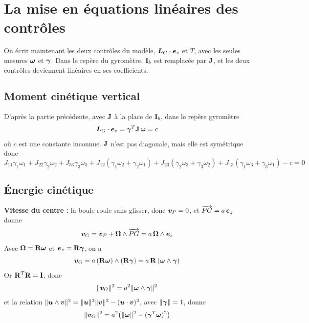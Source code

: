 
\section{La mise en équations linéaires des contrôles}

On écrit maintenant les deux contrôles du modèle,
$\bm{L}_G\cdot\bm{e}_z$ et $T$, avec les seules mesures
$\bm{\omega}$ et $\bm{\gamma}$. Dans le repère du gyromètre,
$\mathbf{I}_b$ est remplacée par $\mathbf{J}$, et les deux contrôles
deviennent linéaires en ses coefficients.

\subsection{Moment cinétique vertical}

D'après la partie précédente, avec $\mathbf{J}$ à la place de
$\mathbf{I}_b$, dans le repère gyromètre
\[
    \bm{L}_G\cdot\bm{e}_z = \bm{\gamma}^T\mathbf{J}\,\bm{\omega} = c
\]
où $c$ est une constante inconnue. $\mathbf{J}$ n'est pas diagonale,
mais elle est symétrique donc 
\[
    J_{11}\gamma_1\omega_1 + J_{22}\gamma_2\omega_2 + J_{33}\gamma_3\omega_3
    + J_{12}(\gamma_1\omega_2 + \gamma_2\omega_1)
    + J_{23}(\gamma_2\omega_3 + \gamma_3\omega_2)
    + J_{13}(\gamma_1\omega_3 + \gamma_3\omega_1) - c = 0
\]

\subsection{Énergie cinétique}

\textbf{Vitesse du centre : } la boule roule sans glisser, donc
$\bm{v}_P = 0$, et $\overrightarrow{PG} = a\,\bm{e}_z$ donne
\[
    \bm{v}_G = \bm{v}_P + \bm{\Omega}\wedge\overrightarrow{PG}
    = a\,\bm{\Omega}\wedge\bm{e}_z
\]
Avec $\bm{\Omega} = \mathbf{R}\bm{\omega}$ et
$\bm{e}_z = \mathbf{R}\bm{\gamma}$, on a 
\[
    \bm{v}_G = a\,(\mathbf{R}\bm{\omega})\wedge(\mathbf{R}\bm{\gamma})
    = a\,\mathbf{R}\,(\bm{\omega}\wedge\bm{\gamma})
\]
Or $\mathbf{R}^T\mathbf{R} = \mathbf{I}$, donc
\[
    \|\bm{v}_G\|^2 = a^2\|\bm{\omega}\wedge\bm{\gamma}\|^2
\]
et la relation
$\|\bm{u}\wedge\bm{v}\|^2 = \|\bm{u}\|^2\|\bm{v}\|^2 - (\bm{u}\cdot\bm{v})^2$,
avec $\|\bm{\gamma}\| = 1$, donne
\[
    \|\bm{v}_G\|^2 = a^2\bigl(\|\bm{\omega}\|^2 - (\bm{\gamma}^T\bm{\omega})^2\bigr)
\]

